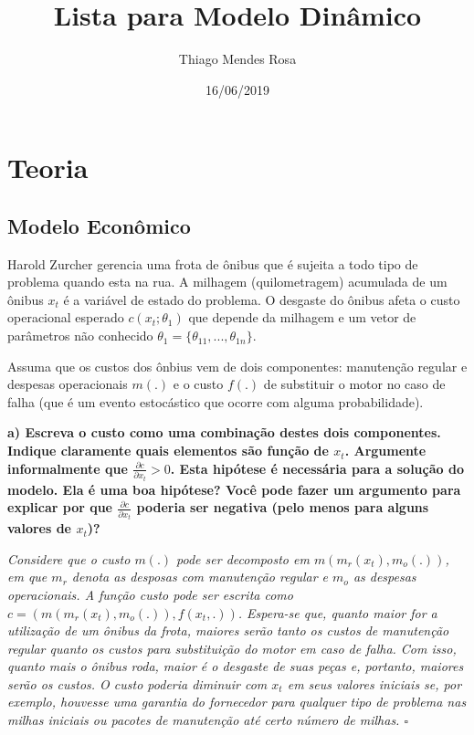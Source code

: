 \documentclass[12pt,a4paper]{article}
\title{Lista para Modelo Dinâmico}
\author{Thiago Mendes Rosa}
\date{16/06/2019}
\begin{document}
\maketitle

\hypertarget{teoria}{%
\section{Teoria}\label{teoria}}

\hypertarget{modelo-economico}{%
\subsection{Modelo Econômico}\label{modelo-economico}}

Harold Zurcher gerencia uma frota de ônibus que é sujeita a todo tipo de
problema quando esta na rua. A milhagem (quilometragem) acumulada de um
ônibus \(x_t\) é a variável de estado do problema. O desgaste do ônibus
afeta o custo operacional esperado \(c(x_t; \theta_1)\) que depende da
milhagem e um vetor de parâmetros não conhecido
\(\theta_1 = \{\theta_{11}, . . . , \theta_{1n}\}\).

Assuma que os custos dos ônbius vem de dois componentes: manutenção
regular e despesas operacionais \(m(.)\) e o custo \(f(.)\) de
substituir o motor no caso de falha (que é um evento estocástico que
ocorre com alguma probabilidade).

\textbf{a) Escreva o custo como uma combinação destes dois componentes.
Indique claramente quais elementos são função de \(x_t\). Argumente
informalmente que \(\frac{\partial c}{\partial x_t} > 0\). Esta hipótese
é necessária para a solução do modelo. Ela é uma boa hipótese? Você pode
fazer um argumento para explicar por que
\(\frac{\partial c}{\partial x_t}\) poderia ser negativa (pelo menos
para alguns valores de \(x_t\))?}

\emph{Considere que o custo \(m(.)\) pode ser decomposto em
\(m(m_r(x_t),m_o(.))\), em que \(m_r\) denota as desposas com manutenção
regular e \(m_o\) as despesas operacionais. A função custo pode ser
escrita como \(c=(m(m_r(x_t),m_o(.)),f(x_t,.))\). Espera-se que, quanto
maior for a utilização de um ônibus da frota, maiores serão tanto os
custos de manutenção regular quanto os custos para substituição do motor
em caso de falha. Com isso, quanto mais o ônibus roda, maior é o
desgaste de suas peças e, portanto, maiores serão os custos. O custo
poderia diminuir com \(x_t\) em seus valores iniciais se, por exemplo,
houvesse uma garantia do fornecedor para qualquer tipo de problema nas
milhas iniciais ou pacotes de manutenção até certo número de milhas.
\(\square\)}
\end{document}
